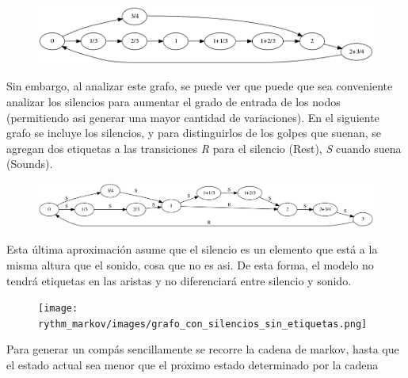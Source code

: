 \begin{figure}[h]
\begin{center}
\includegraphics[width=12cm]{rythm_markov/images/grafo_sin_etiquetas.png}
\label{fig:grafo_sin_etiquetas}
\end{center}
\end{figure}

Sin embargo, al analizar este grafo, se puede ver que puede que sea conveniente analizar los silencios para aumentar el grado de entrada de los nodos
(permitiendo asi generar una mayor cantidad de variaciones). En el siguiente grafo se incluye los silencios, y para distinguirlos de los golpes que 
suenan, se agregan dos etiquetas a las transiciones \emph{R} para el silencio (Rest), \emph{S} cuando suena (Sounds).

\begin{figure}[h]
\begin{center}
\includegraphics[width=12cm]{rythm_markov/images/grafo_con_etiquetas.png}
\label{fig:grafo_con_etiquetas}
\end{center}
\end{figure}

Esta \'ultima aproximaci\'on asume que el silencio es un elemento que est\'a a la misma altura que el sonido, cosa que no es asi. 
De esta forma, el modelo no tendr\'a etiquetas en las aristas y no diferenciar\'a entre silencio y sonido.

\begin{figure}[h]
\begin{center}
\texttt{[image: rythm\_markov/images/grafo\_con\_silencios\_sin\_etiquetas.png]}
\label{fig:grafo_con_etiquetas}
\end{center}
\end{figure}

Para generar un comp\'as sencillamente se recorre la cadena de markov, hasta que el estado actual sea menor que el proximo estado determinado por la cadena


